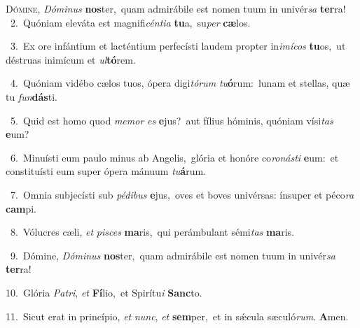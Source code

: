 \lettrine{\initial\textcolor{\initialcolor}{D}}{ómine,} \textit{Dó}\-\textit{mi}\textit{nus} \textbf{nos}\-ter,~\star quam admirábile est nomen tuum in univér\textit{sa} \textbf{ter}\-ra!\\
{\numbfont\textcolor{\numbcolor}{~2.}}~Quóniam eleváta est magnifi\-\textit{cén}\-\textit{ti}\textit{a} \textbf{tu}\-a,~\star su\textit{per} \textbf{cæ}\-los.\par
{\numbfont\textcolor{\numbcolor}{~3.}}~Ex ore infántium et lacténtium perfecísti laudem propter in\-\textit{i}\-\textit{mí}\textit{cos} \textbf{tu}\-os,~\star ut déstruas inimícum et \textit{ul}\-\textbf{tó}rem.\par
{\numbfont\textcolor{\numbcolor}{~4.}}~Quóniam vidébo cælos tuos, ópera digi\-\textit{tó}\-\textit{rum} \textit{tu}\-\textbf{ó}rum:~\star lunam et stellas, quæ tu \textit{fun}\-\textbf{dás}ti.\par
{\numbfont\textcolor{\numbcolor}{~5.}}~Quid est homo quod \textit{me}\-\textit{mor} \textit{es} \textbf{e}\-jus?~\star aut fílius hóminis, quóniam vísi\textit{tas} \textbf{e}\-um?\par
{\numbfont\textcolor{\numbcolor}{~6.}}~Minuísti eum paulo minus ab Angelis,~\dagger glória et honóre co\-\textit{ro}\-\textit{nás}\textit{ti} \textbf{e}\-um:~\star et constituísti eum super ópera mánuum \textit{tu}\-\textbf{á}rum.\par
{\numbfont\textcolor{\numbcolor}{~7.}}~Omnia subjecísti sub \textit{pé}\-\textit{di}\textit{bus} \textbf{e}\-jus,~\star oves et boves univérsas: ínsuper et péco\textit{ra} \textbf{cam}\-pi.\par
{\numbfont\textcolor{\numbcolor}{~8.}}~Vólucres cæli, \textit{et} \textit{pi}\-\textit{sces} \textbf{ma}\-ris,~\star qui perámbulant sémi\textit{tas} \textbf{ma}\-ris.\par
{\numbfont\textcolor{\numbcolor}{~9.}}~Dómine, \textit{Dó}\-\textit{mi}\textit{nus} \textbf{nos}\-ter,~\star quam admirábile est nomen tuum in univér\textit{sa} \textbf{ter}\-ra!\par
{\numbfont\textcolor{\numbcolor}{10.}}~Glória \textit{Pa}\-\textit{tri}, \textit{et} \textbf{Fí}\-lio,~\star et Spirítu\textit{i} \textbf{Sanc}\-to.\par
{\numbfont\textcolor{\numbcolor}{11.}}~Sicut erat in princípio, \textit{et} \textit{nunc}\-, \textit{et} \textbf{sem}\-per,~\star et in sǽcula sæculó\-\textit{rum}\-. \textbf{A}\-men.\par
